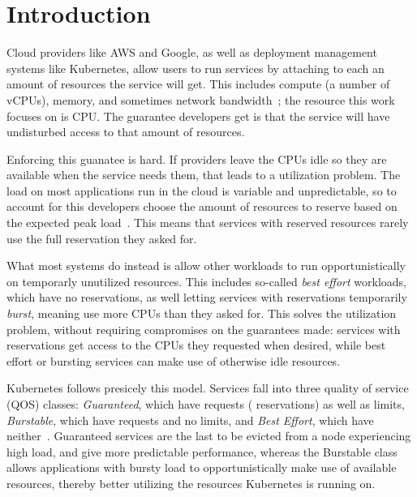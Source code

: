 \section{Introduction}
\label{s:intro}

Cloud providers like AWS and Google, as well as deployment management systems
like Kubernetes, allow users to run services by attaching to each an amount of
resources the service will get. This includes compute (a number of vCPUs),
memory, and sometimes network bandwidth~\cite{aws-ec2-resources,
kubernetes-resources}; the resource this work focuses on is CPU. The guarantee
developers get is that the service will have undisturbed access to that amount
of resources.

Enforcing this guanatee is hard. If providers leave the CPUs idle so they are
available when the service needs them, that leads to a utilization problem. The
load on most applications run in the cloud is variable and unpredictable, so to
account for this developers choose the amount of resources to reserve based on
the expected peak load~\cite{borg, nu, overprovision}. This means that services
with reserved resources rarely use the full reservation they asked for. 

What most systems do instead is allow other workloads to run opportunistically
on temporarly unutilized resources. This includes so-called \textit{best effort}
workloads, which have no reservations, as well letting services with
reservations temporarily \textit{burst}, meaning use more CPUs than they asked
for. This solves the utilization problem, without requiring compromises on the
guarantees made: services with reservations get access to the CPUs they
requested when desired, while best effort or bursting services can make use of
otherwise idle resources.

Kubernetes follows presicely this model. Services fall into three quality of
service (QOS) classes: \textit{Guaranteed}, which have requests (\ie{}
reservations) as well as limits, \textit{Burstable}, which have requests and no
limits, and \textit{Best Effort}, which have
neither~\cite{kubernetes-pod-qos-types}. Guaranteed services are the last to be
evicted from a node experiencing high load, and give more predictable
performance, whereas the Burstable class allows applications with bursty load to
opportunistically make use of available resources, thereby better utilizing the
resources Kubernetes is running on.

